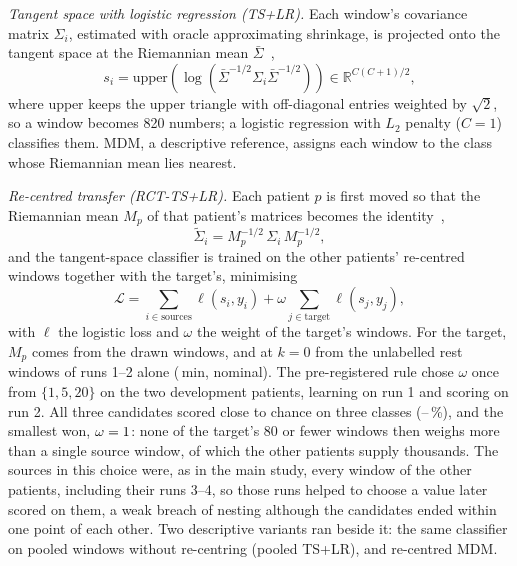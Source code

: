 \emph{Tangent space with logistic regression (TS+LR).} Each window's covariance matrix
$\Sigma_i$, estimated with oracle approximating shrinkage, is projected onto the tangent space at
the Riemannian mean $\bar{\Sigma}$~\cite{barachant2012},
\begin{equation}
s_i = \mathrm{upper}\!\left( \log\!\left( \bar{\Sigma}^{-1/2} \Sigma_i \bar{\Sigma}^{-1/2}
\right) \right) \in \mathbb{R}^{C(C+1)/2},
\label{eq:ts}
\end{equation}
where $\mathrm{upper}$ keeps the upper triangle with off-diagonal entries weighted by
$\sqrt{2}$, so a window becomes 820 numbers; a logistic regression with $L_2$ penalty ($C = 1$)
classifies them. MDM, a descriptive reference, assigns each window to the class whose Riemannian
mean lies nearest.

\emph{Re-centred transfer (RCT-TS+LR).} Each patient $p$ is first moved so that the Riemannian
mean $M_p$ of that patient's matrices becomes the identity~\cite{zanini2018},
\begin{equation}
\tilde{\Sigma}_i = M_p^{-1/2} \, \Sigma_i \, M_p^{-1/2},
\label{eq:rct}
\end{equation}
and the tangent-space classifier is trained on the other patients' re-centred windows together
with the target's, minimising
\begin{equation}
\mathcal{L} = \sum_{i \in \text{sources}} \ell(s_i, y_i) + \omega \sum_{j \in \text{target}}
\ell(s_j, y_j),
\label{eq:weight}
\end{equation}
with $\ell$ the logistic loss and $\omega$ the weight of the target's windows. For the target,
$M_p$ comes from the drawn windows, and at $k = 0$ from the unlabelled rest windows of runs 1--2
alone (\rqTwoRestMinutes\,min, nominal). The pre-registered rule chose $\omega$ once from
$\{1, 5, 20\}$ on the two development patients, learning on run 1 and scoring on run 2. All three
candidates scored close to chance on three classes
(\rqTwoHparamRctTslrMeanMin--\rqTwoHparamRctTslrMeanMax\,\%), and the smallest won,
$\omega = 1$: none of the target's 80 or fewer windows then weighs more
than a single source window, of which the other patients supply thousands. The sources in this
choice were, as in the main study, every window of the other patients, including their runs 3--4,
so those runs helped to choose a value later scored on them, a weak breach of nesting although
the candidates ended within one point of each other. Two descriptive variants ran beside it: the
same classifier on pooled windows without re-centring (pooled TS+LR), and re-centred MDM.

